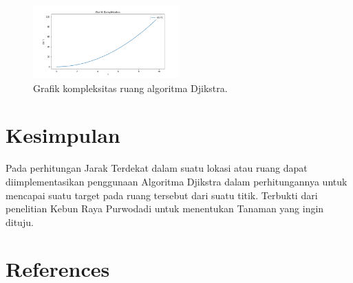 \documentclass[conference]{IEEEtran}
\begin{document}
    \begin{figure}[H]
        \centerline{\includegraphics[width=0.5\textwidth]{./sources/onn.png}}
        \caption{Grafik kompleksitas ruang algoritma Djikstra.}
        \label{fig9}
    \end{figure}

\section{Kesimpulan}

    Pada perhitungan Jarak Terdekat dalam suatu lokasi atau ruang dapat diimplementasikan penggunaan Algoritma Djikstra
    dalam perhitungannya untuk mencapai suatu target pada ruang tersebut dari suatu titik. Terbukti dari penelitian Kebun Raya
    Purwodadi untuk menentukan Tanaman yang ingin dituju.

\section*{References}



\end{document}
